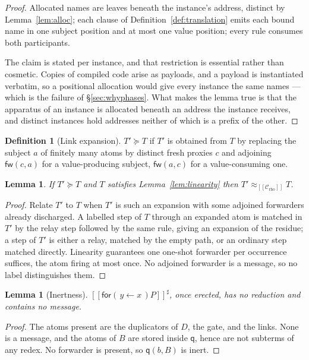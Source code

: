 \documentclass[11pt]{article}
\theoremstyle{plain}
\newtheorem{lemma}[theorem]{Lemma}
\theoremstyle{definition}
\newtheorem{definition}[theorem]{Definition}
\theoremstyle{remark}
\newcommand{\inp}[3]{\mathsf{for}(\,#1 \leftarrow #2\,)#3}
\newcommand{\enc}[1]{[\![#1]\!]}
\newcommand{\Ctx}{\mathscr{C}}
\newcommand{\bisim}{\approx}
\newcommand{\fw}{\mathsf{fw}}
\newcommand{\qq}{\mathsf{q}}
\begin{document}
\begin{proof}
Allocated names are leaves beneath the instance's address, distinct by
Lemma~\ref{lem:alloc}; each clause of Definition~\ref{def:translation} emits
each bound name in one subject position and at most one value position; every
rule consumes both participants.

The claim is stated per instance, and that restriction is essential rather
than cosmetic. Copies of compiled code arise as payloads, and a payload is
instantiated verbatim, so a positional allocation would give every instance
the same names --- which is the failure of \S\ref{sec:whyphases}. What makes
the lemma true is that the apparatus of an instance is allocated beneath an
address the instance receives, and distinct instances hold addresses neither
of which is a prefix of the other.
\end{proof}

\begin{definition}[Link expansion]
$T' \succeq T$ if $T'$ is obtained from $T$ by replacing the subject $a$ of
finitely many atoms by distinct fresh proxies $c$ and adjoining $\fw(c,a)$
for a value-producing subject, $\fw(a,c)$ for a value-consuming one.
\end{definition}

\begin{lemma}
\label{lem:linkexp}
If $T' \succeq T$ and $T$ satisfies Lemma~\ref{lem:linearity} then
$T' \bisim_{\enc{\Ctx_{\mathrm{rho}}}} T$.
\end{lemma}

\begin{proof}
Relate $T'$ to $T$ when $T'$ is such an expansion with some adjoined
forwarders already discharged. A labelled step of $T$ through an expanded
atom is matched in $T'$ by the relay step followed by the same rule, giving
an expansion of the residue; a step of $T'$ is either a relay, matched by the
empty path, or an ordinary step matched directly. Linearity guarantees one
one-shot forwarder per occurrence suffices, the atom firing at most once. No
adjoined forwarder is a message, so no label distinguishes them.
\end{proof}

\begin{lemma}[Inertness]
\label{lem:inert}
$\enc{\inp{y}{x}{P}}^{\sharp}$, once erected, has no reduction and contains
no message.
\end{lemma}

\begin{proof}
The atoms present are the duplicators of $D$, the gate, and the links. None
is a message, and the atoms of $B$ are stored inside $\qq$, hence are not
subterms of any redex. No forwarder is present, so $\qq(b,B)$ is inert.
\end{proof}
\end{document}
